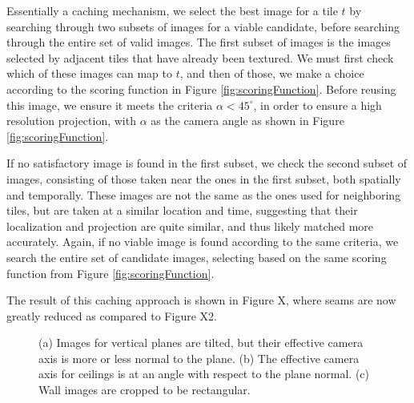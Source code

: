 \documentclass[]{spie}  %
\begin{document}
Essentially a caching mechanism, we select the best image for a tile
$t$ by searching through two subsets of images for a viable candidate,
before searching through the entire set of valid images. The first
subset of images is the images selected by adjacent tiles that have
already been textured. We must first check which of these images can
map to $t$, and then of those, we make a choice according to the
scoring function in Figure \ref{fig:scoringFunction}. Before reusing
this image, we ensure it meets the criteria $\alpha < 45^\circ$, in
order to ensure a high resolution projection, with $\alpha$ as the
camera angle as shown in Figure \ref{fig:scoringFunction}.

If no satisfactory image is found in the first subset, we check the
second subset of images, consisting of those taken near the ones in
the first subset, both spatially and temporally. These images are not
the same as the ones used for neighboring tiles, but are taken at a
similar location and time, suggesting that their localization and
projection are quite similar, and thus likely matched more
accurately. Again, if no viable image is found according to the same
criteria, we search the entire set of candidate images, selecting
based on the same scoring function from Figure
\ref{fig:scoringFunction}.

The result of this caching approach is shown in Figure X, where seams
are now greatly reduced as compared to Figure X2.

\begin{figure}
  \centering
  \centering
  \centering
  \caption{(a) Images for vertical planes are tilted, but their
    effective camera axis is more or less normal to the plane. (b) The
    effective camera axis for ceilings is at an angle with respect to
    the plane normal. (c) Wall images are cropped to be rectangular.}
  \label{fig:projectionAngles}
\end{figure}
\end{document}
